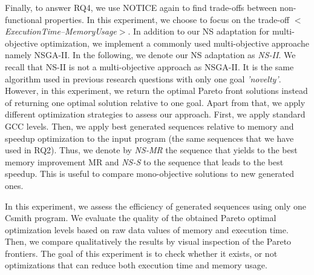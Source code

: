 Finally, to answer RQ4, we use NOTICE again to find trade-offs between non-functional properties. In this experiment, we choose to focus on the trade-off \textit{$<$ExecutionTime--MemoryUsage$>$}. In addition to our NS adaptation for multi-objective optimization, we implement a commonly used multi-objective approache namely NSGA-II\cite{deb2002fast}. In the following, we denote our NS adaptation as \textit{NS-II}. We recall that NS-II is not a multi-objective approach as NSGA-II. It is the same algorithm used in previous research questions with only one goal \textit{'novelty'}. However, in this experiment, we return the optimal Pareto front solutions instead of returning one optimal solution relative to one goal. 
Apart from that, we apply different optimization strategies to assess our approach. First, we apply standard GCC levels. Then, we apply best generated sequences relative to memory and speedup optimization to the input program (the same sequences that we have used in RQ2). Thus, we denote by \textit{NS-MR} the sequence that yields to the best memory improvement MR and \textit{NS-S} to the sequence that leads to the best speedup. This is useful to compare mono-objective solutions to new generated ones.

In this experiment, we assess the efficiency of generated sequences using only one Csmith program.
We evaluate the quality of the obtained Pareto optimal optimization levels based on raw data values of memory and execution time. Then, we compare qualitatively the results by visual inspection of the Pareto frontiers.
The goal of this experiment is to check whether it exists, or not optimizations that can reduce both execution time and memory usage.





